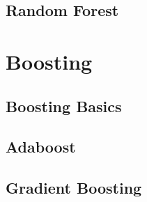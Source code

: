\subsection{Random Forest}

\section{Boosting}

\subsection{Boosting Basics}

\subsection{Adaboost}

\subsection{Gradient Boosting}